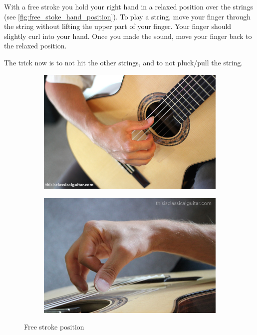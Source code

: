 With a free stroke you hold your right hand in a relaxed position over the strings (see \autoref{fig:free_stoke_hand_position}). To play a string, move your finger through the string without lifting the upper part of your finger. Your finger should slightly curl into your hand. Once you made the sound, move your finger back to the relaxed position.

The trick now is to not hit the other strings, and to not pluck/pull the string.

\begin{figure}[h]
  \begin{subfigure}[b]{0.45\textwidth}
    \includegraphics[width=\textwidth]{../../Images/Bradford-right-hand-close-2016.jpg}
    \caption{}
    \label{fig:}
  \end{subfigure}
  \hfill
  \begin{subfigure}[b]{0.45\textwidth}
    \includegraphics[width=\textwidth]{../../Images/brad-right-stroke-2016.jpg}
    \caption{}
    \label{fig:}
  \end{subfigure}
  \caption{Free stroke position \cite{FreeStrokePositionBradlyWerner}}
  \label{fig:free_stoke_hand_position}
\end{figure}

